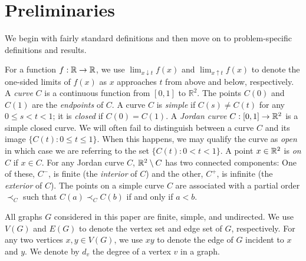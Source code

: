 \section{Preliminaries}

We begin with fairly standard definitions and then move on to problem-specific definitions and results.


For a function $f:\mathbb{R}\to\mathbb{R}$, we use $\lim_{x\downarrow t} f(x)$ and
$\lim_{x\uparrow t} f(x)$ to denote the one-sided limits of $f(x)$
as $x$ approaches $t$ from above and below, respectively.  
%
A \emph{curve} $C$ is a continuous function from $[0,1]$
to $\mathbb{R}^2$.  The points $C(0)$ and $C(1)$ are the \emph{endpoints} of $C$.  A curve $C$ is \emph{simple} if $C(s)\neq C(t)$
for any $0\le s<t< 1$; it is \emph{closed} if $C(0)=C(1)$.  A \emph{Jordan
	curve} $C:[0,1]\to\mathbb{R}^2$ is a simple closed curve.  
We will often fail to distinguish between a curve $C$ and its
image $\{C(t):0\le t\le 1\}$.  When this happens, we may qualify the curve as
\emph{open} in which case we are referring to the set $\{C(t):0< t< 1\}$.
A point $x\in\mathbb{R}^2$ is \emph{on} $C$ if $x\in C$.  
%
For any Jordan curve $C$, $\mathbb{R}^2\setminus C$ has two connected
components: One of these, $C^-$, is finite (the {\em interior} of $C$) and the other, $C^+$, is
infinite (the {\em exterior} of $C$).  
%
The points on a simple curve $C$ are associated with a partial order $\prec_C$ such that $C(a)\prec_C C(b)$ if and only if $a<b$.  


All graphs $G$ considered in this paper are finite, simple, and
undirected.   We use $V(G)$ and $E(G)$ to denote the vertex set and edge
set of $G$, respectively. For any two vertices $x,y\in V(G)$, we use $xy$
to denote the edge of $G$ incident to $x$ and $y$. We denote by $d_v$ the degree of a vertex $v$ in a graph. 


